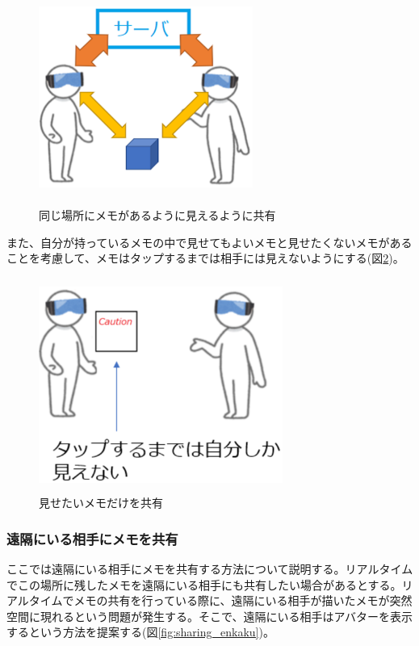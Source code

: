 \documentclass[11pt,a4j, titlepage]{jarticle} %
\begin{document}
\begin{figure}[H]
  \begin{center}
    \includegraphics[clip,height=7.0cm,width=7.0cm]{./sharing_taimen.eps}
    \caption{同じ場所にメモがあるように見えるように共有}
    \label{fig:sharing_taimen}
  \end{center}
\end{figure}

また、自分が持っているメモの中で見せてもよいメモと見せたくないメモがあることを考慮して、メモはタップするまでは相手には見えないようにする(図\ref{fig:sharing_taimen2})。

\begin{figure}[H]
  \begin{center}
    \includegraphics[clip,height=7.0cm,width=8.0cm]{./sharing_taimen2.eps}
    \caption{見せたいメモだけを共有}
    \label{fig:sharing_taimen2}
  \end{center}
\end{figure}

\subsubsection{遠隔にいる相手にメモを共有}
ここでは遠隔にいる相手にメモを共有する方法について説明する。リアルタイムでこの場所に残したメモを遠隔にいる相手にも共有したい場合があるとする。リアルタイムでメモの共有を行っている際に、遠隔にいる相手が描いたメモが突然空間に現れるという問題が発生する。そこで、遠隔にいる相手はアバターを表示するという方法を提案する(図\ref{fig:sharing_enkaku})。
\end{document}
